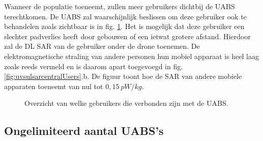 \documentclass[twocolumn]{phdsymp_dutch}
\begin{document}
Wanneer de populatie toeneemt, zullen meer gebruikers dichtbij de \gls{UABS} terechtkomen.
De \gls{UABS} zal waarschijnlijk beslissen om deze gebruiker ook te behandelen zoals zichtbaar is in fig. \ref{fig:connectionMap}.
Het is mogelijk dat deze gebruiker een slechter padverlies heeft door gebouwen of een ietwat grotere afstand. Hierdoor zal de
\gls{DL} \gls{SAR} van de gebruiker onder de drone toenemen.
De elektromagnetische straling van andere personen hun mobiel apparaat is heel laag zoals 
reeds vermeld en is daarom apart toegevoegd in fig.  \ref{fig:uvsulsarcentralUsers}.b.
De figuur toont hoe de \gls{SAR} van andere mobiele apparaten toeneemt van nul tot $0,15\ pW/kg$.
\begin{figure}[h]
\hfill
{}
\caption{ Overzicht van welke gebruikers die verbonden zijn met de \acs{UABS}.}
  \label{fig:connectionMap}
\end{figure}

\FloatBarrier
\subsection{Ongelimiteerd aantal \gls{UABS}'s}
\end{document}
